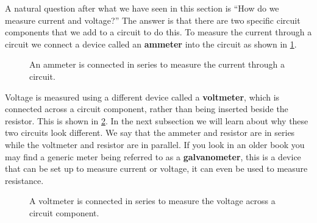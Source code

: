 A natural question after what we have seen in this section is ``How do we measure current and voltage?'' The answer is that there are two specific circuit components that we add to a circuit to do this. To measure the current through a circuit we connect a device called an \textbf{ammeter} into the circuit as shown in \cref{fig: ammeter}.

\begin{figure}[ht]
    \centering
    \caption{An ammeter is connected in series to measure the current through a circuit.}
    \label{fig: ammeter}
\end{figure}

Voltage is measured using a different device called a \textbf{voltmeter}, which is connected across a circuit component, rather than  being inserted beside the resistor. This is shown in \cref{fig: voltmeter}. In the next subsection we will learn about why these two circuits look different. We say that the ammeter and resistor are in series while the voltmeter and resistor are in parallel. If you look in an older book you may find a generic meter being referred to as a \textbf{galvanometer}, this is a device that can be set up to measure current or voltage, it can even be used to measure resistance. 

\begin{figure}[ht]
    \centering
    \caption{A voltmeter is connected in series to measure the voltage across a circuit component.}
    \label{fig: voltmeter}
\end{figure}

